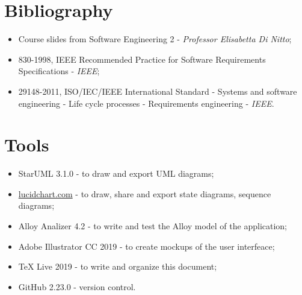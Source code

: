 \documentclass[12pt,a4paper]{report}
\begin{document}
	\section{Bibliography}
	\begin{itemize}
	\item Course slides from Software Engineering 2 - \emph{Professor Elisabetta Di Nitto};
	\item 830-1998, IEEE Recommended Practice for Software Requirements Specifications - \emph{IEEE};
	\item 29148-2011, ISO/IEC/IEEE International Standard - Systems and software engineering - Life cycle processes - Requirements engineering - \emph{IEEE}.
	\end{itemize}

	\section{Tools}
	\begin{itemize}
	\item StarUML 3.1.0 - to draw and export UML diagrams;
	\item \url{lucidchart.com} - to draw, share and export state diagrams, sequence diagrams;
	\item Alloy Analizer 4.2 - to write and test the Alloy model of the application;
	\item Adobe Illustrator CC 2019 - to create mockups of the user interfeace;
	\item TeX Live 2019 - to write and organize this document;
	\item GitHub 2.23.0 - version control.
	\end{itemize}

\end{document}
